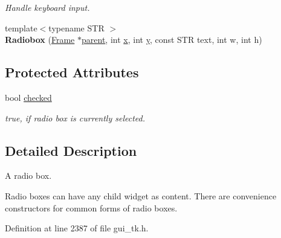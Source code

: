 \begin{DoxyCompactItemize}
\begin{DoxyCompactList}\small\item\em Handle keyboard input. \end{DoxyCompactList}\item 
\hypertarget{classGUI_1_1Radiobox_a1043df1e70f217de9e5e61563f5d8ef1}{{\footnotesize template$<$typename S\-T\-R $>$ }\\{\bfseries Radiobox} (\hyperlink{classGUI_1_1Frame}{Frame} $\ast$\hyperlink{classGUI_1_1Window_a2e593ff65e7702178d82fe9010a0b539}{parent}, int \hyperlink{classGUI_1_1Window_a6ca6a80ca00c9e1d8ceea8d3d99a657d}{x}, int \hyperlink{classGUI_1_1Window_a0ee8e923aff2c3661fc2e17656d37adf}{y}, const S\-T\-R text, int w, int h)}\label{classGUI_1_1Radiobox_a1043df1e70f217de9e5e61563f5d8ef1}

\end{DoxyCompactItemize}
\subsection*{Protected Attributes}
\begin{DoxyCompactItemize}
\item 
\hypertarget{classGUI_1_1Radiobox_ace7ecfe96f9746040c020362d13d7046}{bool \hyperlink{classGUI_1_1Radiobox_ace7ecfe96f9746040c020362d13d7046}{checked}}\label{classGUI_1_1Radiobox_ace7ecfe96f9746040c020362d13d7046}

\begin{DoxyCompactList}\small\item\em {\ttfamily true}, if radio box is currently selected. \end{DoxyCompactList}\end{DoxyCompactItemize}


\subsection{Detailed Description}
A radio box. 

Radio boxes can have any child widget as content. There are convenience constructors for common forms of radio boxes. 

Definition at line 2387 of file gui\-\_\-tk.\-h.



